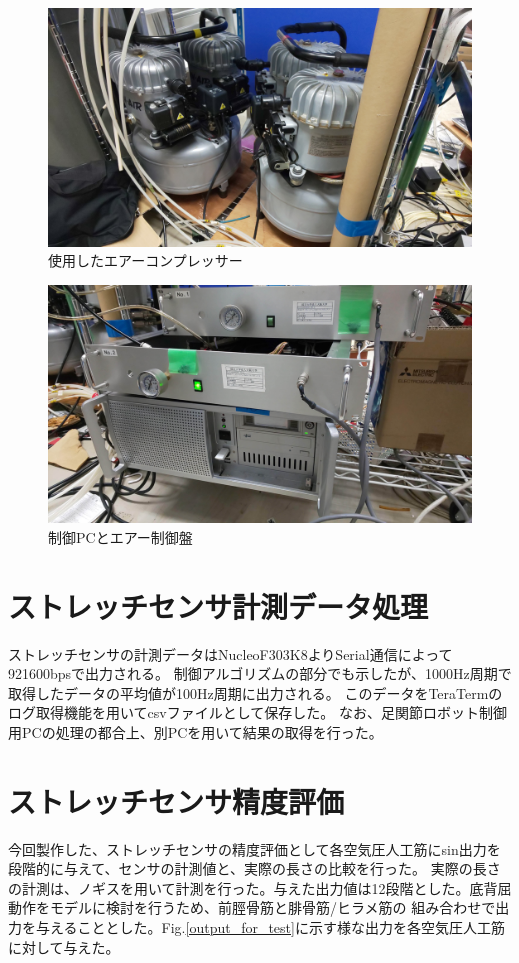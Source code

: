 \begin{figure}[h]
    \begin{center}
     \includegraphics[width=0.65\columnwidth,clip]{./3_analysis/compressor.eps}
     \caption{使用したエアーコンプレッサー}
     \label{fig:compressor}
    \end{center}
\end{figure}

\begin{figure}[h]
    \begin{center}
     \includegraphics[width=0.65\columnwidth,clip]{./3_analysis/PC.eps}
     \caption{制御PCとエアー制御盤}
     \label{fig:PC}
    \end{center}
\end{figure}

\section{ストレッチセンサ計測データ処理}
ストレッチセンサの計測データはNucleoF303K8よりSerial通信によって921600bpsで出力される。
制御アルゴリズムの部分でも示したが、1000Hz周期で取得したデータの平均値が100Hz周期に出力される。
このデータをTeraTermのログ取得機能を用いてcsvファイルとして保存した。
なお、足関節ロボット制御用PCの処理の都合上、別PCを用いて結果の取得を行った。

\section{ストレッチセンサ精度評価}
今回製作した、ストレッチセンサの精度評価として各空気圧人工筋にsin出力を段階的に与えて、センサの計測値と、実際の長さの比較を行った。
実際の長さの計測は、ノギスを用いて計測を行った。与えた出力値は12段階とした。底背屈動作をモデルに検討を行うため、前脛骨筋と腓骨筋/ヒラメ筋の
組み合わせで出力を与えることとした。Fig.\ref{output_for_test}に示す様な出力を各空気圧人工筋に対して与えた。

